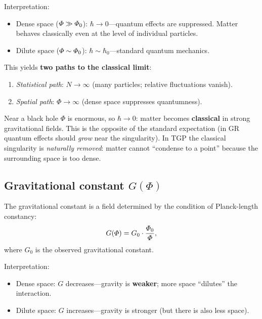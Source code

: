 Interpretation:
\begin{itemize}[nosep]
  \item Dense space ($\varPhi \gg \varPhi_0$):
        $\hbar \to 0$---quantum effects are suppressed.
        Matter behaves classically even at the level of
        individual particles.
  \item Dilute space ($\varPhi \sim \varPhi_0$):
        $\hbar \sim \hbar_0$---standard quantum mechanics.
\end{itemize}

This yields \textbf{two paths to the classical limit}:
\begin{enumerate}[nosep]
  \item \emph{Statistical path}: $N \to \infty$
        (many particles; relative fluctuations vanish).
  \item \emph{Spatial path}: $\Phi \to \infty$
        (dense space suppresses quantumness).
\end{enumerate}

\begin{remark}
Near a black hole $\Phi$ is enormous, so $\hbar \to 0$:
matter becomes \textbf{classical} in strong gravitational fields.
This is the opposite of the standard expectation (in GR quantum
effects should \emph{grow} near the singularity).  In TGP the
classical singularity is \emph{naturally removed}: matter cannot
``condense to a point'' because the surrounding space is too dense.
\end{remark}

\subsection{Gravitational constant $G(\Phi)$}\label{ssec:G}

\begin{axiom}\label{ax:G}
The gravitational constant is a field determined by the
condition of Planck-length constancy:
\begin{equation}\label{eq:GPhi}
    G(\varPhi) = G_0 \cdot \frac{\varPhi_0}{\varPhi},
\end{equation}
where $G_0$ is the observed gravitational constant.
\end{axiom}

Interpretation:
\begin{itemize}[nosep]
  \item Dense space: $G$ decreases---gravity is
        \textbf{weaker}; more space ``dilutes'' the interaction.
  \item Dilute space: $G$ increases---gravity is stronger
        (but there is also less space).
\end{itemize}

